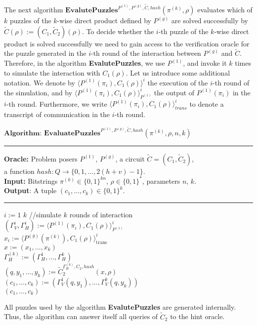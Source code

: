 %
%
The next algorithm $\textbf{EvalutePuzzles}^{P^{(1)}, P^{(g)}, \widetilde{C}, hash}(\pi^{(k)}, \rho)$
evaluates which of $k$ puzzles of the $k$-wise direct product defined by $P^{(g)}$ are solved successfully by $\widetilde{C}(\rho) := (C_1,\widetilde{C}_2)(\rho)$.
To decide whether the $i$-th puzzle of the $k$-wise direct product is solved successfully we need to gain access to the verification oracle
for the puzzle generated in the $i$-th round of the interaction between $P^{(g)}$ and $\widetilde{C}$.
Therefore, in the algorithm \textbf{EvalutePuzzles}, we use $P^{(1)}$, and invoke it $k$ times to simulate the interaction with $C_1(\rho)$.
Let us introduce some additional notation. We denote by $\langle P^{(1)}(\pi_i), C_1(\rho)\rangle^i$ the execution of
the $i$-th round of the simulation, and by $\langle P^{(1)}(\pi_i), C_1(\rho)\rangle^i_{P^{(1)}}$ the output of $P^{(1)}(\pi_i)$ in the $i$-th round.
Furthermore, we write $\langle P^{(1)}(\pi_i), C_1(\rho)\rangle^i_{trans}$ to denote a transcript of communication in the $i$-th round.
%
\begin{codeblock}
  $\textbf{Algorithm: EvaluatePuzzles}^{P^{(1)}, P^{(g)}, \widetilde{C}, hash}(\pi^{(k)}, \rho, n, k)$
  \medskip \hrule \medskip
  \textbf{Oracle:}  Problem posers $P^{(1)}$, $P^{(g)}$, a circuit $\widetilde{C} = (C_1, \widetilde{C}_2)$,\\
  \IndII a function $hash : Q \rightarrow \{0,1,\dots, 2(h+v)-1\}$.\\
  \textbf{Input:} Bitstrings $\pi^{(k)} \in \{0,1\}^{kn}$, $\rho \in \{0,1\}^{*}$, parameters $n$, $k$.\\
  \textbf{Output}: A tuple $(c_1, \dots, c_k) \in \{0,1\}^{k}$.
  \medskip\hrule\medskip
  \For $i:=1$ \To $k$ \Do \IndII //simulate $k$ rounds of interaction \\
  \IndI $(\Gamma_V^{i}, \Gamma_H^{i}) := \langle P^{(1)}(\pi_i), C_1(\rho) \rangle_{P^{(1)}}^i$\\
  \IndI $x_i := \langle P^{(g)}(\pi^{(k)}), C_1(\rho) \rangle^i_{\text{trans}}$ \\
  $x := (x_1, \dots, x_k)$ \\
  $\Gamma_H^{(k)} := (\Gamma_H^1, \dots, \Gamma_H^k)$ \\
  $(q, y_1, \dots, y_k) := \widetilde{C}_2^{\Gamma_H^{(k)}, C_2, hash} (x, \rho)$ \\
  $(c_1, \dots, c_k) := (\Gamma_V^{1}(q, y_1), \dots, \Gamma_V^{k}(q, y_k))$\\
  \Return $(c_1, \dots, c_k)$
\end{codeblock}
%
All puzzles used by the algorithm \textbf{EvalutePuzzles} are generated internally.
Thus, the algorithm can answer itself all queries of $\widetilde{C}_2$ to the hint oracle.

